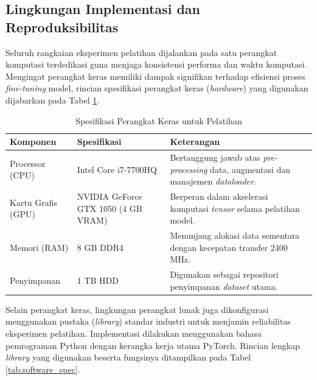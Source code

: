 \subsection{Lingkungan Implementasi dan Reproduksibilitas}
Seluruh rangkaian eksperimen pelatihan dijalankan pada satu perangkat komputasi terdedikasi guna menjaga konsistensi performa dan waktu komputasi.
Mengingat perangkat keras memiliki dampak signifikan terhadap efisiensi proses \textit{fine-tuning} model, rincian spesifikasi perangkat keras (\textit{hardware}) yang digunakan dijabarkan pada Tabel \ref{tab:hardware_spec}.

\begin{table}[H]
    \centering
    \caption{Spesifikasi Perangkat Keras untuk Pelatihan}
    \label{tab:hardware_spec}
    \small %
    \begin{tabularx}{\textwidth}{|l|p{3.8cm}|X|} 
        \hline
        \textbf{Komponen} & \textbf{Spesifikasi} & \textbf{Keterangan} \\ \hline
        Processor (CPU) & Intel Core i7-7700HQ & Bertanggung jawab atas \textit{pre-processing} data, augmentasi dan manajemen \textit{dataloader}. \\ \hline
        Kartu Grafis (GPU) & NVIDIA GeForce GTX 1050 (4 GB VRAM) & Berperan dalam akselerasi komputasi \textit{tensor} selama pelatihan model. \\ \hline
        Memori (RAM) & 8 GB DDR4 & Menunjang alokasi data sementara dengan kecepatan transfer 2400 MHz. \\ \hline
        Penyimpanan & 1 TB HDD & Digunakan sebagai repositori penyimpanan \textit{dataset} utama. \\ \hline
    \end{tabularx}
\end{table}

Selain perangkat keras, lingkungan perangkat lunak juga dikonfigurasi menggunakan pustaka (\textit{library}) standar industri untuk menjamin reliabilitas eksperimen pelatihan.
Implementasi dilakukan menggunakan bahasa pemrograman Python dengan kerangka kerja utama PyTorch.
Rincian lengkap \textit{library} yang digunakan beserta fungsinya ditampilkan pada Tabel \ref{tab:software_spec}.

